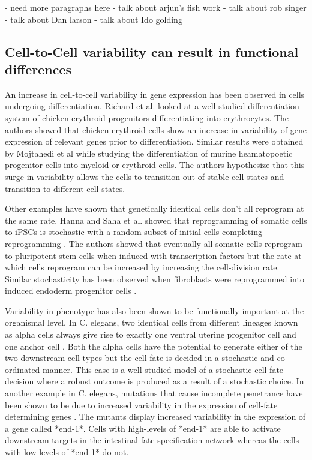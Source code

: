 - need more paragraphs here
- talk about arjun's fish work
- talk about rob singer
- talk about Dan larson
- talk about Ido golding


\subsection{Cell-to-Cell variability can result in functional differences}
An increase in cell-to-cell variability in gene expression has been observed in cells undergoing differentiation. Richard et al.  \cite{richard_single-cell-based_2016} looked at a well-studied differentiation system of chicken erythroid progenitors differentiating into erythrocytes. The authors showed that chicken erythroid cells show an increase in variability of gene expression of relevant genes prior to differentiation. Similar results were obtained by Mojtahedi et al  \cite{mojtahedi_cell_2016} while studying the differentiation of murine heamatopoetic progenitor cells into myeloid or erythroid cells. The authors hypothesize that this surge in variability allows the cells to transition out of stable cell-states and transition to different cell-states. 


Other examples have shown that genetically identical cells don't all reprogram at the same rate. Hanna and Saha et al. showed that reprogramming of somatic cells to iPSCs is stochastic with a random subset of initial cells completing reprogramming  \cite{hanna_direct_2009}. The authors showed that eventually all somatic cells reprogram to pluripotent stem cells when induced with transcription factors but the rate at which cells reprogram can be increased by increasing the cell-division rate. Similar stochasticity has been observed when fibroblasts were reprogrammed into induced endoderm progenitor cells \cite{biddy_single-cell_2018}.

Variability in phenotype has also been shown to be functionally important at the organismal level. In C. elegans, two identical cells from different lineages known as alpha cells always give rise to exactly one ventral uterine progenitor cell and one anchor cell \cite{seydoux_cell_1989}. Both the alpha cells have the potential to generate either of the two downstream cell-types but the cell fate is decided in a stochastic and co-ordinated manner. This case is a well-studied model of a stochastic cell-fate decision where a robust outcome is produced as a result of a stochastic choice. In another example in C. elegans, mutations that cause incomplete penetrance have been shown to be due to increased variability in the expression of cell-fate determining genes  \cite{raj_variability_2010}.  The mutants display increased variability in the expression of a gene called *end-1*. Cells with high-levels of *end-1* are able to activate downstream targets in the intestinal fate specification network whereas the cells with low levels of *end-1* do not. 

